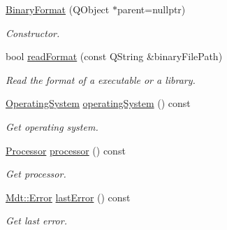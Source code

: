 \begin{DoxyCompactItemize}
\item 
\hyperlink{class_mdt_1_1_deploy_utils_1_1_binary_format_afc8824fd9d24d38d37dc11d9845d6d6c}{Binary\+Format} (Q\+Object $\ast$parent=nullptr)\hypertarget{class_mdt_1_1_deploy_utils_1_1_binary_format_afc8824fd9d24d38d37dc11d9845d6d6c}{}\label{class_mdt_1_1_deploy_utils_1_1_binary_format_afc8824fd9d24d38d37dc11d9845d6d6c}

\begin{DoxyCompactList}\small\item\em Constructor. \end{DoxyCompactList}\item 
bool \hyperlink{class_mdt_1_1_deploy_utils_1_1_binary_format_a9a0d738562a41af21b81d12199b62ea4}{read\+Format} (const Q\+String \&binary\+File\+Path)\hypertarget{class_mdt_1_1_deploy_utils_1_1_binary_format_a9a0d738562a41af21b81d12199b62ea4}{}\label{class_mdt_1_1_deploy_utils_1_1_binary_format_a9a0d738562a41af21b81d12199b62ea4}

\begin{DoxyCompactList}\small\item\em Read the format of a executable or a library. \end{DoxyCompactList}\item 
\hyperlink{namespace_mdt_1_1_deploy_utils_a998c3ae583084b7cac9e9a71b9e1ac32}{Operating\+System} \hyperlink{class_mdt_1_1_deploy_utils_1_1_binary_format_af0a1fd32ffe0e3b0ec79192090345139}{operating\+System} () const 
\begin{DoxyCompactList}\small\item\em Get operating system. \end{DoxyCompactList}\item 
\hyperlink{namespace_mdt_1_1_deploy_utils_aa3c03f55a06150c118902133f9a74b6f}{Processor} \hyperlink{class_mdt_1_1_deploy_utils_1_1_binary_format_a6ef69355fc5185e203e2952ebeafc62e}{processor} () const 
\begin{DoxyCompactList}\small\item\em Get processor. \end{DoxyCompactList}\item 
\hyperlink{class_mdt_1_1_error}{Mdt\+::\+Error} \hyperlink{class_mdt_1_1_deploy_utils_1_1_binary_format_a66bc1c286aa55a5634fcb89669d53496}{last\+Error} () const \hypertarget{class_mdt_1_1_deploy_utils_1_1_binary_format_a66bc1c286aa55a5634fcb89669d53496}{}\label{class_mdt_1_1_deploy_utils_1_1_binary_format_a66bc1c286aa55a5634fcb89669d53496}

\begin{DoxyCompactList}\small\item\em Get last error. \end{DoxyCompactList}\end{DoxyCompactItemize}
